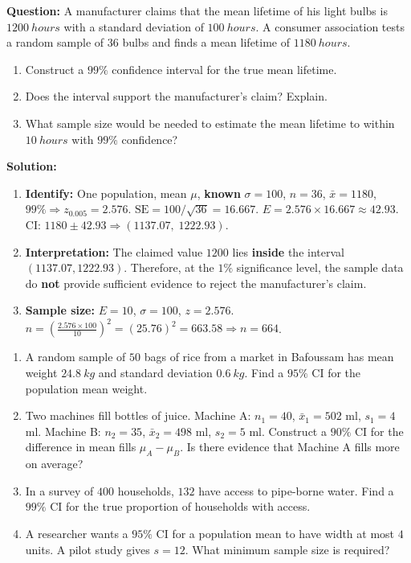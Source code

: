 \documentclass[11pt]{article}
\begin{document}
\begin{exoresolu}
\textbf{Question:} A manufacturer claims that the mean lifetime of his light bulbs is $\SI{1200}{hours}$ with a standard deviation of $\SI{100}{hours}$. A consumer association tests a random sample of $36$ bulbs and finds a mean lifetime of $\SI{1180}{hours}$.
\begin{enumerate}
\item Construct a $99\%$ confidence interval for the true mean lifetime.
\item Does the interval support the manufacturer's claim? Explain.
\item What sample size would be needed to estimate the mean lifetime to within $\SI{10}{hours}$ with $99\%$ confidence?
\end{enumerate}
\tcblower
\textbf{Solution:}
\begin{enumerate}
\item \textbf{Identify:} One population, mean $\mu$, \textbf{known} $\sigma=100$, $n=36$, $\bar{x}=1180$, $99\% \Rightarrow z_{0.005}=2.576$.
  $\text{SE} = 100/\sqrt{36} = 16.667$.
  $E = 2.576 \times 16.667 \approx 42.93$.
  CI: $1180 \pm 42.93 \Rightarrow (1137.07,\; 1222.93)$.
\item \textbf{Interpretation:} The claimed value $1200$ lies \textbf{inside} the interval $(1137.07, 1222.93)$. Therefore, at the $1\%$ significance level, the sample data do \textbf{not} provide sufficient evidence to reject the manufacturer's claim.
\item \textbf{Sample size:} $E = 10$, $\sigma=100$, $z=2.576$.
  $n = \left(\frac{2.576 \times 100}{10}\right)^2 = (25.76)^2 = 663.58 \Rightarrow n = 664$.
\end{enumerate}
\end{exoresolu}

\begin{exercice}
\begin{enumerate}
\item A random sample of $50$ bags of rice from a market in Bafoussam has mean weight $\SI{24.8}{kg}$ and standard deviation $\SI{0.6}{kg}$. Find a $95\%$ CI for the population mean weight.
\item Two machines fill bottles of juice. Machine A: $n_1=40$, $\bar{x}_1=502$ ml, $s_1=4$ ml. Machine B: $n_2=35$, $\bar{x}_2=498$ ml, $s_2=5$ ml. Construct a $90\%$ CI for the difference in mean fills $\mu_A-\mu_B$. Is there evidence that Machine A fills more on average?
\item In a survey of $400$ households, $132$ have access to pipe-borne water. Find a $99\%$ CI for the true proportion of households with access.
\item A researcher wants a $95\%$ CI for a population mean to have width at most $4$ units. A pilot study gives $s=12$. What minimum sample size is required?
\end{enumerate}
\end{exercice}
\end{document}
